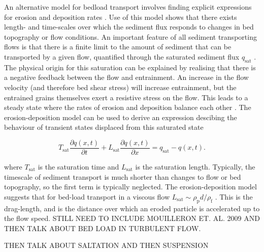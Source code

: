 \documentclass[12pt]{article}
\begin{document}
An alternative model for bedload transport involves finding explicit expressions for erosion and deposition rates \citep{Charru06(2)}. Use of this model shows that there exists length- and time-scales over which the sediment flux responds to changes in bed topography or flow conditions. An important feature of all sediment transporting flows is that there is a finite limit to the amount of sediment that can be transported by a given flow, quantified through the saturated sediment flux $q_{\text{sat}}$ \citep{Bagnold41, Owen64}. The physical origin for this saturation can be explained by realising that there is a negative feedback between the flow and entrainment. An increase in the flow velocity (and therefore bed shear stress) will increase entrainment, but the entrained grains themselves exert a resistive stress on the flow. This leads to a steady state where the rates of erosion and deposition balance each other \citep{Andreotti13}. The erosion-deposition model can be used to derive an expression descibing the behaviour of transient states displaced from this saturated state

\begin{equation}
\label{equ:sed_flux}
T_{\text{sat}} \frac{\partial q(x,t)}{\partial t} + L_{\text{sat}} \frac{\partial q(x,t)}{\partial x} = q_{\text{sat}} - q(x,t) .
\end{equation}

where $T_{\text{sat}}$ is the saturation time and $L_{\text{sat}}$ is the saturation length. Typically, the timescale of sediment transport is much shorter than changes to flow or bed topography, so the first term is typically neglected. The erosion-deposition model suggests that for bed-load transport in a viscous flow $L_{\text{sat}} \sim \rho_{\text{p}} d / \rho_{\text{f}}$ \citep{Charru06}. This is the drag-length, and is the distance over which an eroded particle is accelerated up to the flow speed. STILL NEED TO INCLUDE MOUILLERON ET. AL. 2009 AND THEN TALK ABOUT BED LOAD IN TURBULENT FLOW.


THEN TALK ABOUT SALTATION AND THEN SUSPENSION
\end{document}
